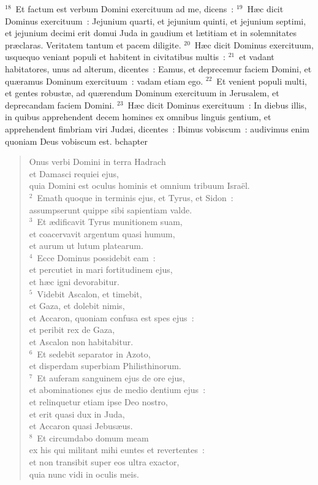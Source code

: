 ${}^{18}$~Et factum est verbum Domini exercituum ad me, dicens~:
${}^{19}$~H\ae c dicit Dominus exercituum~: Jejunium quarti, et jejunium quinti, et jejunium septimi, et jejunium decimi erit domui Juda in gaudium et l\ae titiam et in solemnitates pr\ae claras. Veritatem tantum et pacem diligite.
${}^{20}$~H\ae c dicit Dominus exercituum, usquequo veniant populi et habitent in civitatibus multis~:
${}^{21}$~et vadant habitatores, unus ad alterum, dicentes~: Eamus, et deprecemur faciem Domini, et qu\ae ramus Dominum exercituum~: vadam etiam ego.
${}^{22}$~Et venient populi multi, et gentes robust\ae , ad qu\ae rendum Dominum exercituum in Jerusalem, et deprecandam faciem Domini.
${}^{23}$~H\ae c dicit Dominus exercituum~: In diebus illis, in quibus apprehendent decem homines ex omnibus linguis gentium, et apprehendent fimbriam viri Jud\ae i, dicentes~: Ibimus vobiscum~: audivimus enim quoniam Deus vobiscum est.
bchapter\begin{verse}\vspace{-19pt}Onus verbi Domini in terra Hadrach\\ et Damasci requiei ejus,\\ quia Domini est oculus hominis et omnium tribuum Isra\"el.\\
${}^{2}$~Emath quoque in terminis ejus, et Tyrus, et Sidon~:\\ assumpserunt quippe sibi sapientiam valde.\\
${}^{3}$~Et \ae dificavit Tyrus munitionem suam,\\ et coacervavit argentum quasi humum,\\ et aurum ut lutum platearum.\\
${}^{4}$~Ecce Dominus possidebit eam~:\\ et percutiet in mari fortitudinem ejus,\\ et h\ae c igni devorabitur.\\
${}^{5}$~Videbit Ascalon, et timebit,\\ et Gaza, et dolebit nimis,\\ et Accaron, quoniam confusa est spes ejus~:\\ et peribit rex de Gaza,\\ et Ascalon non habitabitur.\\
${}^{6}$~Et sedebit separator in Azoto,\\ et disperdam superbiam Philisthinorum.\\
${}^{7}$~Et auferam sanguinem ejus de ore ejus,\\ et abominationes ejus de medio dentium ejus~:\\ et relinquetur etiam ipse Deo nostro,\\ et erit quasi dux in Juda,\\ et Accaron quasi Jebus\ae us.\\
${}^{8}$~Et circumdabo domum meam\\ ex his qui militant mihi euntes et revertentes~:\\ et non transibit super eos ultra exactor,\\ quia nunc vidi in oculis meis.\end{verse}


